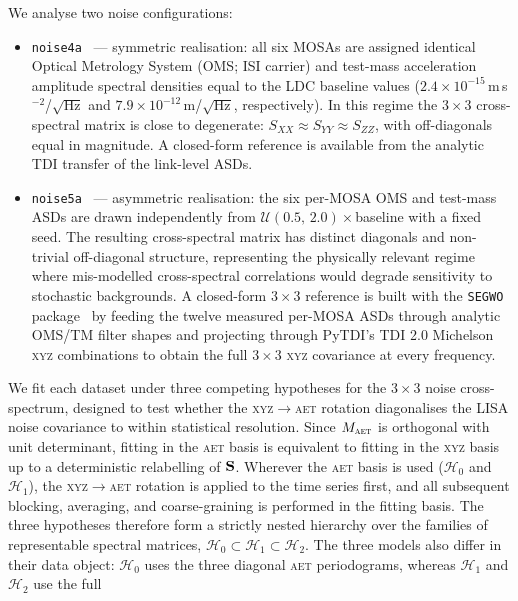 \documentclass[%
	reprint,
	nofootinbib,
	amsmath,
	amssymb,
	aps,
]{revtex4-2}
\renewcommand{\S}{{\bf S}}
\newcommand{\AET}{\textsc{aet}\xspace}
\newcommand{\XYZ}{\textsc{xyz}\xspace}
\begin{document}
	We analyse two noise configurations:
	\begin{itemize}
		\item \texttt{noise4a}~\cite{lisa_noise4a} --- symmetric realisation: all six MOSAs
		are assigned identical Optical Metrology System (OMS; ISI carrier) and test-mass acceleration
		amplitude spectral densities equal to the LDC baseline values
		($2.4\times10^{-15}$\,m\,s$^{-2}$/$\sqrt{\mathrm{Hz}}$ and
		$7.9\times10^{-12}$\,m/$\sqrt{\mathrm{Hz}}$, respectively). In this
		regime the $3\times3$ cross-spectral matrix is close to degenerate:
		$S_{XX}\!\approx\!S_{YY}\!\approx\!S_{ZZ}$, with off-diagonals equal in
		magnitude. A closed-form reference is available from the
		analytic TDI transfer of the link-level ASDs.
		\item \texttt{noise5a}~\cite{lisa_noise5a} --- asymmetric realisation: the six
		per-MOSA OMS and test-mass ASDs are drawn independently from
		$\mathcal{U}(0.5,\,2.0)\times$baseline with a fixed seed. The
		resulting cross-spectral matrix has distinct diagonals and
		non-trivial off-diagonal structure, representing the physically
		relevant regime where mis-modelled cross-spectral correlations
		would degrade sensitivity to stochastic backgrounds. A
		closed-form $3\times3$ reference is built with the
		\texttt{SEGWO} package~\citep{bayle_segwo} by feeding the
		twelve measured per-MOSA ASDs through analytic OMS/TM filter
		shapes and projecting through PyTDI's TDI 2.0 Michelson
		\XYZ combinations to obtain the full
		$3\times3$ \XYZ covariance at every frequency.
	\end{itemize}
	We fit each dataset under three competing hypotheses for the
	$3\times3$ noise cross-spectrum, designed to test whether the
	\XYZ$\to$\AET rotation diagonalises the LISA noise covariance to
	within statistical resolution. Since $M_{\AET}$ is
	orthogonal with unit determinant, fitting in the \AET basis is
	equivalent to fitting in the \XYZ basis up to a deterministic
	relabelling of $\S$. Wherever the \AET basis is used
	($\mathcal{H}_{0}$ and $\mathcal{H}_{1}$), the \XYZ$\to$\AET
	rotation is applied to the time series first, and all subsequent
	blocking, averaging, and coarse-graining is performed in the
	fitting basis. The three hypotheses therefore form a
	strictly nested hierarchy over the families of representable
	spectral matrices,
	$\mathcal{H}_{0}\subset\mathcal{H}_{1}\subset\mathcal{H}_{2}$.
	The three models also differ in their data object:
	$\mathcal{H}_{0}$ uses the three diagonal \AET periodograms,
	whereas $\mathcal{H}_{1}$ and $\mathcal{H}_{2}$ use the full
\end{document}
